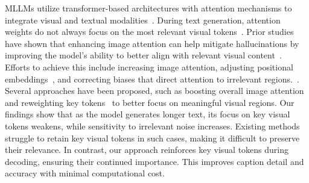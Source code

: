 MLLMs utilize transformer-based architectures with attention mechanisms to integrate visual and textual modalities~\cite{vaswani2017attention, basu2024understanding, osman2023survey}. During text generation, attention weights do not always focus on the most relevant visual tokens~\cite{zhang2024seeing, woo2024don, jiang2024devils}. Prior studies have shown that enhancing image attention can help mitigate hallucinations by improving the model's ability to better align with relevant visual content~\cite{li2024inference, xing2024mitigating}. Efforts to achieve this include increasing image attention, adjusting positional embeddings~\cite{xing2024mitigating, li2025mitigating}, and correcting biases that direct attention to irrelevant regions.~\cite{jiang2024devils, gong2024damro, anonymous2024see}.
Several approaches have been proposed, such as boosting overall image attention~\cite{liu2025paying, jiang2024devils} and reweighting key tokens~\cite{xing2024mitigating} to better focus on meaningful visual regions. Our findings show that as the model generates longer text, its focus on key visual tokens weakens, while sensitivity to irrelevant noise increases. Existing methods struggle to retain key visual tokens in such cases, making it difficult to preserve their relevance. In contrast, our approach reinforces key visual tokens during decoding, ensuring their continued importance. This improves caption detail and accuracy with minimal computational cost.